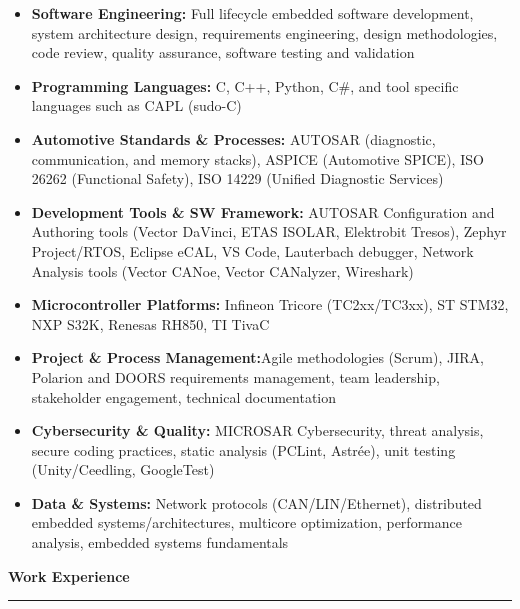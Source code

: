 \documentclass[11pt,letterpaper]{article}
\newcommand{\SectionHeading}[1]{%
  \vspace{0.3cm}
  {\large\bfseries\color{darkblue}#1}
  \vspace{0.1cm}
  \hrule
  \vspace{0.2cm}
}
\begin{document}
\vspace{-0.3cm}
\begin{itemize}[leftmargin=0.2in, itemsep=0.05cm, parsep=0cm]
  \item \textbf{Software Engineering:} Full lifecycle embedded software development, system architecture design, requirements engineering, design methodologies, code review, quality assurance, software testing and validation
  \item \textbf{Programming Languages:} C, C++, Python, C\#, and tool specific languages such as CAPL (sudo-C)
  \item \textbf{Automotive Standards \& Processes:} AUTOSAR (diagnostic, communication, and memory stacks), ASPICE (Automotive SPICE), ISO 26262 (Functional Safety), ISO 14229 (Unified Diagnostic Services)
  \item \textbf{Development Tools \& SW Framework:} AUTOSAR Configuration and Authoring tools (Vector DaVinci, ETAS ISOLAR, Elektrobit Tresos), Zephyr Project/RTOS, Eclipse eCAL, VS Code,  Lauterbach debugger, Network Analysis tools (Vector CANoe, Vector CANalyzer, Wireshark)
  \item \textbf{Microcontroller Platforms:} Infineon Tricore (TC2xx/TC3xx), ST STM32, NXP S32K, Renesas RH850, TI TivaC
  \item \textbf{Project \& Process Management:}Agile methodologies (Scrum), JIRA, Polarion and DOORS requirements management, team leadership, stakeholder engagement, technical documentation
  \item \textbf{Cybersecurity \& Quality:} MICROSAR Cybersecurity, threat analysis, secure coding practices, static analysis (PCLint, Astrée), unit testing (Unity/Ceedling, GoogleTest)
  \item \textbf{Data \& Systems:} Network protocols (CAN/LIN/Ethernet), distributed embedded systems/architectures, multicore optimization, performance analysis, embedded systems fundamentals
\end{itemize}


\SectionHeading{Work Experience}
\end{document}

